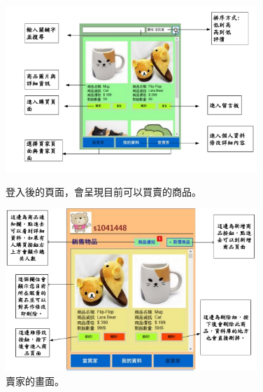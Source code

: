 \documentclass{scrreprt}
\begin{document}
\begin{CJK}{UTF8}{bkai}
\begin{figure}[t]
	\centering
	\includegraphics[width=0.85\textwidth]{search.pdf}
	\caption{登入後的頁面，會呈現目前可以買賣的商品。}
	\centering
	\includegraphics[width=0.85\textwidth]{note.pdf}
	\caption{賣家的畫面。}
\end{figure}


\end{CJK}
\end{document}
